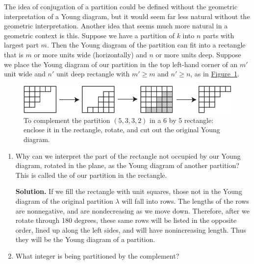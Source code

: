 \documentclass{book}
\begin{document}
\setcounter{project}{308}
\addtocounter{project}{-1}
\begin{activity}[]\label{activity-301}
\hypertarget{p-1557}{}%
The idea of conjugation of a partition could be defined without the geometric interpretation of a Young diagram, but it would seem far less natural without the geometric interpretation. Another idea that seems much more natural in a geometric context is this. Suppose we have a partition of \(k\) into \(n\) parts with largest part \(m\). Then the Young diagram of the partition can fit into a rectangle that is \(m\) or more units wide (horizontally) and \(n\) or more units deep. Suppose we place the Young diagram of our partition in the top left-hand corner of an \(m'\) unit wide and \(n'\) unit deep rectangle with \(m'\ge m\) and \(n' \ge n\), as in \hyperref[complementpartition]{Figure~\ref{complementpartition}}.%
\begin{figure}
\centering
\includegraphics[width=0.7\linewidth]{images/complementpartition}
\caption{To complement the partition \((5,3,3,2)\) in a 6 by 5 rectangle: enclose it in the rectangle, rotate, and cut out the original Young diagram.\label{complementpartition}}
\end{figure}
\begin{enumerate}[font=\bfseries,label=(\alph*),ref=\alph*]
\item\label{task-266} \hypertarget{p-1558}{}%
Why can we interpret the part of the rectangle not occupied by our Young diagram, rotated in the plane, as the Young diagram of another partition? This is called the  of our partition in the rectangle.%
\par\smallskip%
\noindent\textbf{Solution.}\hypertarget{solution-216}{}\quad%
\hypertarget{p-1559}{}%
If we fill the rectangle with unit squares, those not in the Young diagram of the original partition \(\lambda\) will fall into rows.  The lengths of the rows are nonnegative, and are nondecreasing as we move down. Therefore, after we rotate through 180 degrees, these same rows will be listed in the opposite order, lined up along the left sides, and will have nonincreasing length. Thus they will be the Young diagram of a partition.%
\item\label{task-267} \hypertarget{p-1560}{}%
What integer is being partitioned by the complement?%
\par\smallskip%

\end{enumerate}
\end{activity}
\end{document}
